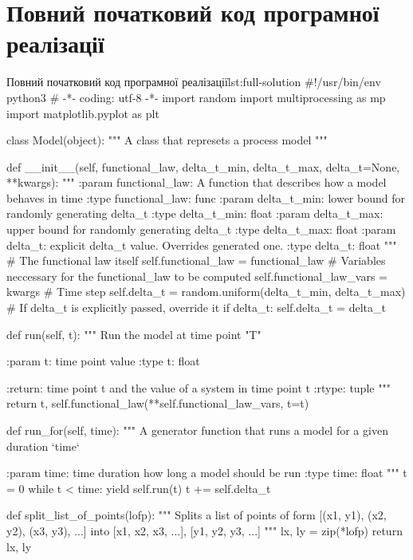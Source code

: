 \documentclass[
	a4paper,
	oneside,
	BCOR = 10mm,
	DIV = 12,
	12pt,
	headings = normal,
]{scrartcl}
\begin{document}
		\section{Повний початковий код програмної реалізації}
		\label{sec:full-listing}
			\begin{listingpython}[toprule = 0pt, bottomrule = 0pt]{Повний початковий код програмної реалізації}{lst:full-solution}
#!/usr/bin/env python3
# -*- coding: utf-8 -*-
import random
import multiprocessing as mp
import matplotlib.pyplot as plt


class Model(object):
    """ A class that represets a process model
    """

    def __init__(self, functional_law, delta_t_min, delta_t_max,
                 delta_t=None, **kwargs):
        """
        :param functional_law: A function that describes how a model
            behaves in time
        :type functional_law: func
        :param delta_t_min: lower bound for randomly generating delta_t
        :type delta_t_min: float
        :param delta_t_max: upper bound for randomly generating delta_t
        :type delta_t_max: float
        :param delta_t: explicit delta_t value. Overrides generated one.
        :type delta_t: float
        """
        # The functional law itself
        self.functional_law = functional_law
        # Variables neccessary for the functional_law to be computed
        self.functional_law_vars = kwargs
        # Time step
        self.delta_t = random.uniform(delta_t_min, delta_t_max)
        # If delta_t is explicitly passed, override it
        if delta_t:
            self.delta_t = delta_t

    def run(self, t):
        """
        Run the model at time point "T"

        :param t: time point value
        :type t: float

        :return: time point t and the value of a system in time point t
        :rtype: tuple
        """
        return t, self.functional_law(**self.functional_law_vars, t=t)

    def run_for(self, time):
        """
        A generator function that runs a model for a given duration `time`

        :param time: time duration how long a model should be run
        :type time: float
        """
        t = 0
        while t < time:
            yield self.run(t)
            t += self.delta_t


def split_list_of_points(lofp):
    """ Splits a list of points of form [(x1, y1), (x2, y2), (x3, y3), ...]
    into [x1, x2, x3, ...], [y1, y2, y3, ...]
    """
    lx, ly = zip(*lofp)
    return lx, ly



\end{listingpython}
\end{document}
